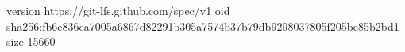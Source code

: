 version https://git-lfs.github.com/spec/v1
oid sha256:fb6e836ca7005a6867d82291b305a7574b37b79db9298037805f205be85b2bd1
size 15660
